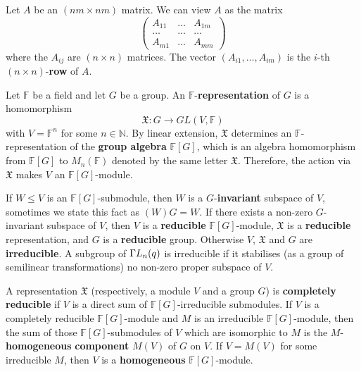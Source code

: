 Let $A$ be an $(nm\times nm)$ matrix. We can view $A$ as the matrix
$$\begin{pmatrix}
A_{11}      &  \ldots & A_{1m}  \\
\ldots           &   \ldots   & \ldots   \\
A_{m1}     & \ldots     & A_{mm}      
\end{pmatrix}$$
where the $A_{ij}$ are $(n \times n)$ matrices. The vector $(A_{i1}, \ldots, A_{im})$ is the $i$-th $(n \times n)$-{\bf row}  of $A.$


\medskip

 Let $\mathbb{F}$ be a field and let $G$ be a group. An $\mathbb{F}$-{\bf representation}  of $G$ is a homomorphism $$\mathfrak{X}: G \to GL(V,\mathbb{F})$$ with $V=\mathbb{F}^n$ for some $n \in  \mathbb{N}$. By linear extension, $\mathfrak{X}$ determines an $\mathbb{F}$-representation of the {\bf group algebra} $\mathbb{F}[G]$,  which is an algebra homomorphism from $\mathbb{F}[G]$ to $M_n(\mathbb{F})$ denoted by the same letter $\mathfrak{X}.$ Therefore, the action via $\mathfrak{X}$ makes $V$  an $\mathbb{F}[G]$-module.

 If $W \le V$ is an  $\mathbb{F}[G]$-submodule, then $W$ is a $G$-{\bf invariant} subspace of $V$, sometimes we state this fact as $(W)G=W.$ If there exists  a non-zero $G$-invariant subspace of $V$, then   $V$ is  a {\bf reducible} $\mathbb{F}[G]$-module, $\mathfrak{X}$ is a {\bf reducible} representation, and $G$ is a {\bf reducible} group. Otherwise $V$, $\mathfrak{X}$ and $G$ are {\bf irreducible}.    A subgroup of ${{\Gamma L}}_n(q)$ is irreducible if it   stabilises (as a group of semilinear transformations) no non-zero proper subspace of $V$. 

 A representation $\mathfrak{X}$ (respectively, a module $V$ and a group $G$) is {\bf completely reducible} if $V$ is a direct sum of $\mathbb{F}[G]$-irreducible submodules. If $V$ is a completely reducible $\mathbb{F}[G]$-module and $M$ is an irreducible $\mathbb{F}[G]$-module, then the sum of those $\mathbb{F}[G]$-submodules of $V$ which are isomorphic to $M$ is the  {$M$-{\bf homogeneous}} {\bf component} $M(V)$ of $G$ on $V$.   If $V=M(V)$ for some irreducible $M$, then $V$ is a {\bf homogeneous} $\mathbb{F}[G]$-module.  

